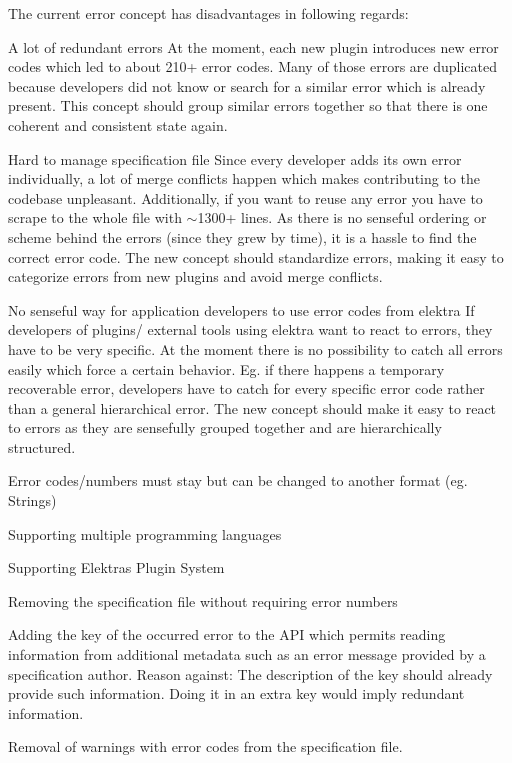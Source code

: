 The current error concept has disadvantages in following regards\+:


\begin{DoxyItemize}
\item A lot of redundant errors At the moment, each new plugin introduces new error codes which led to about 210+ error codes. Many of those errors are duplicated because developers did not know or search for a similar error which is already present. This concept should group similar errors together so that there is one coherent and consistent state again.
\item Hard to manage specification file Since every developer adds its own error individually, a lot of merge conflicts happen which makes contributing to the codebase unpleasant. Additionally, if you want to reuse any error you have to scrape to the whole file with $\sim$1300+ lines. As there is no senseful ordering or scheme behind the errors (since they grew by time), it is a hassle to find the correct error code. The new concept should standardize errors, making it easy to categorize errors from new plugins and avoid merge conflicts.
\item No senseful way for application developers to use error codes from elektra If developers of plugins/ external tools using elektra want to react to errors, they have to be very specific. At the moment there is no possibility to catch all errors easily which force a certain behavior. Eg. if there happens a temporary recoverable error, developers have to catch for every specific error code rather than a general hierarchical error. The new concept should make it easy to react to errors as they are sensefully grouped together and are hierarchically structured.
\end{DoxyItemize}


\begin{DoxyItemize}
\item Error codes/numbers must stay but can be changed to another format (eg. Strings)
\item Supporting multiple programming languages
\item Supporting Elektra\textquotesingle{}s Plugin System
\end{DoxyItemize}


\begin{DoxyItemize}
\item Removing the specification file without requiring error numbers
\item Adding the key of the occurred error to the A\+PI which permits reading information from additional metadata such as an error message provided by a specification author. Reason against\+: The description of the key should already provide such information. Doing it in an extra key would imply redundant information.
\item Removal of warnings with error codes from the specification file.
\end{DoxyItemize}

